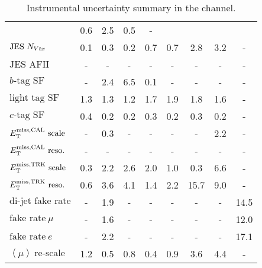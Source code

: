 \begin{table}[h!]
\begin{center}
{\begin{tabular}{l || c c | c c c c c c }
& 0.6 & 2.5 & 0.5 & - \\
$\textrm{JES}~N_{Vtx}$ & 0.1 & 0.3 & 0.2 & 0.7 & 0.7 & 2.8 & 3.2 & - \\
$\textrm{JES AFII}$ & - & - & - & - & - & - & - & - \\
$b\textrm{-tag SF}$ & - & 2.4 & 6.5 & 0.1 & - & - & - & - \\
$\textrm{light tag SF}$ & 1.3 & 1.3 & 1.2 & 1.7 & 1.9 & 1.8 & 1.6 & -
\\
$c\textrm{-tag SF}$ & 0.4 & 0.2 & 0.2 & 0.3 & 0.2 & 0.3 & 0.2 & - \\
$E_{\mathrm{T}}^{\rm miss, CAL}~\textrm{scale}$ & - & 0.3 & - & - & - & - & 2.2 & - \\
$E_{\mathrm{T}}^{\rm miss, CAL}~\textrm{reso.}$ & - & - & - & - & - & - & - & - \\
$E_{\rm T}^{\rm miss, TRK}~\textrm{scale}$ & 0.3 & 2.2 & 2.6 & 2.0 & 1.0 & 0.3 & 6.6 & -
\\
$E_{\rm T}^{\rm miss, TRK}~\textrm{reso.}$ & 0.6 & 3.6 & 4.1 & 1.4 & 2.2 & 15.7 & 9.0 &
- \\
$\textrm{di-jet fake rate}$ & - & 1.9 & - & - & - & - & - & 14.5 \\
$\textrm{fake rate}~\mu$ & - & 1.6 & - & - & - & - & - & 12.0 \\
$\textrm{fake rate}~e$ & - & 2.2 & - & - & - & - & - & 17.1 \\
$\left \langle \mu \right \rangle~\textrm{re-scale}$ & 1.2 & 0.5 & 0.8
& 0.4 & 0.9 & 3.6 & 4.4 & - \\
\hline
\end{tabular}
}
\caption[Instrumental uncertainty summary in the \emme
  channel.]{Instrumental uncertainty summary in the \emme channel.}
\label{chap:analysis:tab:exp_sys_df}
\end{center}
\end{table}
